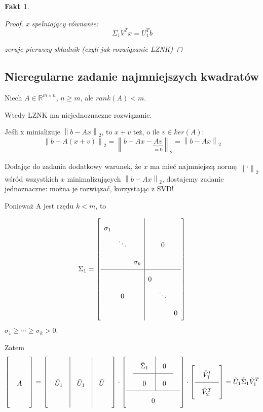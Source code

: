 \documentclass[hidelinks,a4paper,fleqn,oneside]{book}
\newcommand{\RR}{\mathbb{R}}
\newcommand{\norm}[1]{\left\lVert#1\right\rVert}
\newtheorem{fakt}{Fakt}
\begin{document}
\begin{fakt}
\begin{enumerate}
\begin{proof}
		      x spełniający równanie:
		      \[
		      	\Sigma_1V^Tx = U_1^Tb
		      \]
		      
		      zeruje pierwszy składnik (czyli jak rozwiązanie LZNK)
		      \end{proof}
	\end{enumerate}
\end{fakt}

\subsection{Nieregularne zadanie najmniejszych kwadratów}

Niech $A \in \RR^{m \times n}$, $n \geq m$, ale $rank(A) < m$.

Wtedy LZNK ma niejednoznaczne rozwiązanie.

Jeśli x minializuje $\norm{b - Ax}_2$, to $x+v$ też, o ile $v \in ker(A)$:
\[
	\norm{b - A(x + v)}_2 = \norm{b - Ax - \underbrace{Av}_{=0}}_2 = \norm{b - Ax}_2
\]

Dodając do zadania dodatkowy warunek, że $x$ ma mieć najmniejszą normę $\norm{\cdot}_2$ wśród wszystkich $x$ minimalizujących $\norm{b - Ax}_2$, dostajemy zadanie jednoznaczne: można je rozwiązać, korzystając z SVD!

Ponieważ A jest rzędu $k<m$, to 

\[
	\Sigma_1 = \left[ \begin{array}{ccc|ccc}
		\sigma_1 &  &  &  &  & \\ 
		&  \ddots &  &  & 0  & \\ 
		&  & \sigma_k  &  &  & \\ 
		\hline
		&  & &  0 &  & \\ 
		&  0 &  &  & \ddots & \\ 
		&  &  &  &  & 0
	\end{array} \right]
\]
$\sigma_1 \geq \cdots \geq \sigma_k > 0$.

Zatem
\[\arraycolsep=1em\def\arraystretch{2}
	\left[\begin{array}{c} \\ A \\ \ \end{array}\right] =
	\left[\begin{array}{c|c|c} & &\ \\ \tilde{U}_1 & \hat{U}_1 & \tilde{U} \\ & & \ \end{array}\right] \cdot \left[ \begin{array}{c} \begin{array}{c|c} \tilde{\Sigma}_1 & 0 \\ \hline 0 & 0 \end{array} \\ \hline 0\end{array}\right] \cdot \left[ \begin{array}{c} \tilde{V}_1^t \\ \hline \tilde{V}_2^T \end{array}\right] = \tilde{U}_1 \tilde{\Sigma}_1 \tilde{V}_1^T
\]
\end{document}
